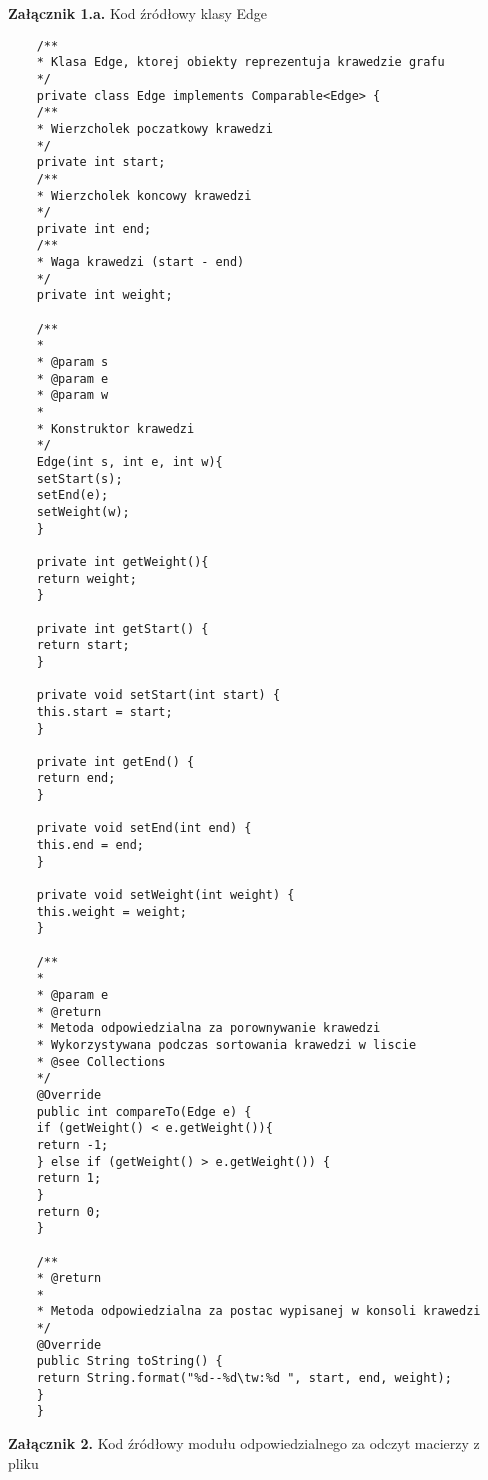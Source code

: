 \begin{center}
	\textbf{Załącznik 1.a.} Kod źródłowy klasy Edge
\end{center}

\begin{lstlisting}
	/**
	* Klasa Edge, ktorej obiekty reprezentuja krawedzie grafu
	*/
	private class Edge implements Comparable<Edge> {
	/**
	* Wierzcholek poczatkowy krawedzi
	*/
	private int start;
	/**
	* Wierzcholek koncowy krawedzi
	*/
	private int end;
	/**
	* Waga krawedzi (start - end)
	*/
	private int weight;
	
	/**
	*
	* @param s
	* @param e
	* @param w
	*
	* Konstruktor krawedzi
	*/
	Edge(int s, int e, int w){
	setStart(s);
	setEnd(e);
	setWeight(w);
	}
	
	private int getWeight(){
	return weight;
	}
	
	private int getStart() {
	return start;
	}
	
	private void setStart(int start) {
	this.start = start;
	}
	
	private int getEnd() {
	return end;
	}
	
	private void setEnd(int end) {
	this.end = end;
	}
	
	private void setWeight(int weight) {
	this.weight = weight;
	}
	
	/**
	*
	* @param e
	* @return
	* Metoda odpowiedzialna za porownywanie krawedzi
	* Wykorzystywana podczas sortowania krawedzi w liscie
	* @see Collections
	*/
	@Override
	public int compareTo(Edge e) {
	if (getWeight() < e.getWeight()){
	return -1;
	} else if (getWeight() > e.getWeight()) {
	return 1;
	}
	return 0;
	}
	
	/**
	* @return
	*
	* Metoda odpowiedzialna za postac wypisanej w konsoli krawedzi
	*/
	@Override
	public String toString() {
	return String.format("%d--%d\tw:%d ", start, end, weight);
	}
	}
\end{lstlisting}
\newpage
\begin{center}
	\textbf{Załącznik 2.} Kod źródłowy modułu odpowiedzialnego za odczyt macierzy z pliku
\end{center}

